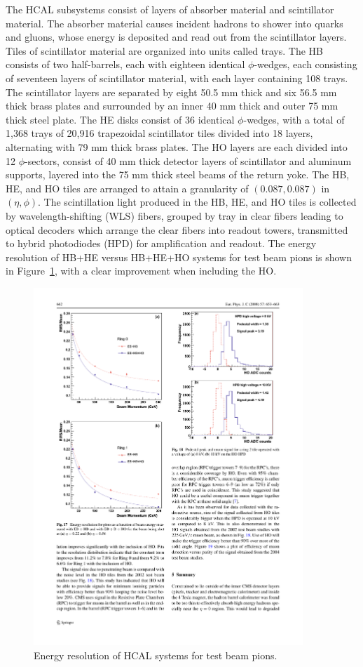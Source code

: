 \indent The HCAL subsystems consist of layers of absorber material and scintillator material. The absorber material causes incident hadrons to shower into quarks and gluons, whose energy is deposited and read out from the scintillator layers. Tiles of scintillator material are organized into units called trays. The HB consists of two half-barrels, each with eighteen identical $\phi$-wedges, each consisting of seventeen layers of scintillator material, with each layer containing 108 trays. The scintillator layers are separated by eight 50.5 mm thick and six 56.5 mm thick brass plates and surrounded by an inner 40 mm thick and outer 75 mm thick steel plate. The HE disks consist of 36 identical $\phi$-wedges, with a total of 1,368 trays of 20,916 trapezoidal scintillator tiles divided into 18 layers, alternating with 79 mm thick brass plates. The HO layers are each divided into 12 $\phi$-sectors, consist of 40 mm thick detector layers of scintillator and aluminum supports, layered into the 75 mm thick steel beams of the return yoke. The HB, HE, and HO tiles are arranged to attain a granularity of $(0.087, 0.087)$ in $(\eta, \phi)$. The scintillation light produced in the HB, HE, and HO tiles is collected by wavelength-shifting (WLS) fibers, grouped by tray in clear fibers leading to optical decoders which arrange the clear fibers into readout towers, transmitted to hybrid photodiodes (HPD) for amplification and readout. The energy resolution of HB+HE versus HB+HE+HO systems for test beam pions is shown in Figure~\ref{fig:eres_hcal}, with a clear improvement when including the HO.

\begin{figure}[tbh]
\centering
\includegraphics[width=4in]{figures/eres_hcal.pdf}
\caption{Energy resolution of HCAL systems for test beam pions.}
\label{fig:eres_hcal}
\end{figure}

